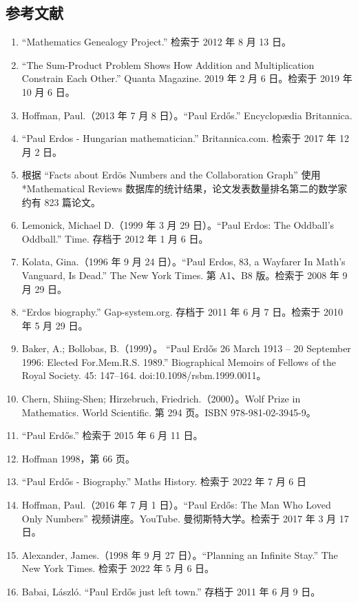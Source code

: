 \subsection{参考文献}
\begin{enumerate}
\item “Mathematics Genealogy Project.” 检索于 2012 年 8 月 13 日。
\item “The Sum-Product Problem Shows How Addition and Multiplication Constrain Each Other.” Quanta Magazine. 2019 年 2 月 6 日。检索于 2019 年 10 月 6 日。
\item Hoffman, Paul.（2013 年 7 月 8 日）。“Paul Erdős.” Encyclopædia Britannica.
\item “Paul Erdos - Hungarian mathematician.” Britannica.com. 检索于 2017 年 12 月 2 日。
\item 根据 “Facts about Erdös Numbers and the Collaboration Graph” 使用 *Mathematical Reviews 数据库的统计结果，论文发表数量排名第二的数学家约有 823 篇论文。
\item Lemonick, Michael D.（1999 年 3 月 29 日）。“Paul Erdos: The Oddball’s Oddball.” Time. 存档于 2012 年 1 月 6 日。
\item Kolata, Gina.（1996 年 9 月 24 日）。“Paul Erdos, 83, a Wayfarer In Math’s Vanguard, Is Dead.” The New York Times. 第 A1、B8 版。检索于 2008 年 9 月 29 日。
\item “Erdos biography.” Gap-system.org. 存档于 2011 年 6 月 7 日。检索于 2010 年 5 月 29 日。
\item Baker, A.; Bollobas, B.（1999）。 “Paul Erdős 26 March 1913 – 20 September 1996: Elected For.Mem.R.S. 1989.” Biographical Memoirs of Fellows of the Royal Society. 45: 147–164. doi:10.1098/rsbm.1999.0011。
\item Chern, Shiing-Shen; Hirzebruch, Friedrich.（2000）。Wolf Prize in Mathematics. World Scientific. 第 294 页。ISBN 978-981-02-3945-9。
\item “Paul Erdős.” 检索于 2015 年 6 月 11 日。
\item Hoffman 1998，第 66 页。
\item “Paul Erdős - Biography.” Maths History. 检索于 2022 年 7 月 6 日
\item Hoffman, Paul.（2016 年 7 月 1 日）。“Paul Erdős: The Man Who Loved Only Numbers” 视频讲座。YouTube. 曼彻斯特大学。检索于 2017 年 3 月 17 日。
\item Alexander, James.（1998 年 9 月 27 日）。“Planning an Infinite Stay.” The New York Times. 检索于 2022 年 5 月 6 日。
\item Babai, László. “Paul Erdős just left town.” 存档于 2011 年 6 月 9 日。

\end{enumerate}
